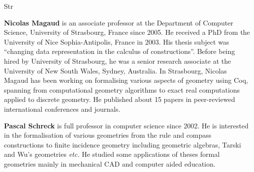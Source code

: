 \begin{sitedescription}{Str}
\begin{compactitem}
\item{\bf Nicolas Magaud} is an associate professor at the Department of
Computer Science, University of Strasbourg, France since 2005. He
received a PhD from the University of Nice Sophia-Antipolis, France in
2003. His thesis subject was ``changing data representation in the
calculus of constructions''. Before being hired by University of
Strasbourg, he was a senior research associate at the University of
New South Wales, Sydney, Australia. In Strasbourg, Nicolas Magaud
has been working on formalising various aspects of geometry using Coq, spanning from
computational geometry algorithms to exact real computations applied to
discrete geometry. He published about 15 papers in peer-reviewed
international conferences and journals.  

\item{\bf Pascal Schreck} is full professor in computer science since 2002. He is interested in the formalisation of various geometries from the rule and compass constructions to finite incidence geometry including geometric algebras, Tarski and Wu's geometries \emph{etc.} He studied some applications of theses formal geometries mainly in mechanical CAD and computer aided education.
\end{compactitem}

\end{sitedescription}


